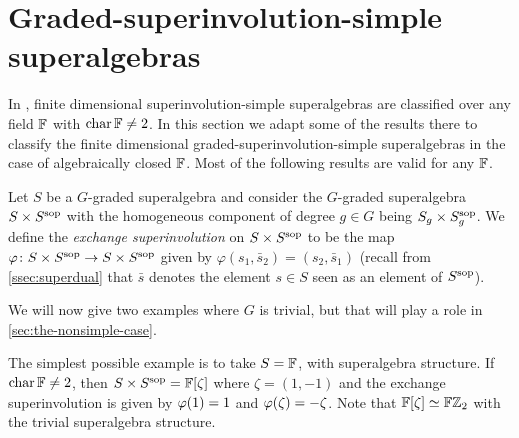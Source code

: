 \section{Graded-superinvolution-simple superalgebras}\label{grd-sinv-simple}

In \cite{racine}, finite dimensional superinvolution-simple superalgebras are classified over any field $\mathbb{F}$ with $\operatorname{char} \mathbb{F} \neq 2$. 
In this section we adapt some of the results there to classify the finite dimensional graded-superinvolution-simple superalgebras in the case of algebraically closed $\mathbb{F}$. 
Most of the following results are valid for any $\mathbb{F}$. 


\begin{defi}\label{def:SxSsop}
	Let $S$ be a $G$-graded superalgebra and consider the $G$-graded superalgebra $S \times S^{\mathrm{sop}}$ with the homogeneous component of degree $g\in G$ being $S_g \times S^{\mathrm{sop}}_g$. 
	We define the \emph{exchange superinvolution} on $S \times S^{\mathrm{sop}}$ to be the map $\varphi\colon S \times S^{\mathrm{sop}} \to S \times S^{\mathrm{sop}}$ given by $\varphi (s_1, \bar s_2) = (s_2, \bar s_1)$ (recall from \cref{ssec:superdual} that $\bar s$ denotes the element $s \in S$ seen as an element of $S^{\mathrm{sop}}$). 
\end{defi}

We will now give two examples where $G$ is trivial, but that will play a role in \cref{sec:the-nonsimple-case}.

\begin{ex}\label{ex:FxF-iso-FZ2}
	The simplest possible example is to take $S = \mathbb{F}$, with superalgebra structure. 
	If $\operatorname{char} \mathbb{F} \neq 2$, then $S\times S^{\mathrm{sop}} = \mathbb{F} [\zeta]$ where $\zeta = (1, -1)$ and the exchange superinvolution is given by $\varphi(1) = 1$ and $\varphi(\zeta) = -\zeta$.
	Note that $\mathbb{F} [\zeta] \simeq \mathbb{F}\mathbb{Z}_2$ with the trivial superalgebra structure. 
\end{ex}


